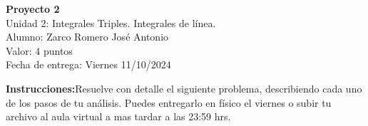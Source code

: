 \documentclass[12pt]{exam}
\begin{document}
\centering

\Large 
\textbf{Proyecto 2}\\
\large 
Unidad 2: Integrales Triples. Integrales de línea. \\
Alumno: Zarco Romero José Antonio\\
Valor: 4 puntos\\
\normalsize
Fecha de entrega: 
Viernes 11/10/2024

\vskip10pt

\normalsize

\pointformat{\bfseries\boldmath(\thepoints)}
\vskip10pt

\begin{tcolorbox}
  \textbf{Instrucciones:}Resuelve con detalle el siguiente problema, describiendo cada uno de los pasos de
  tu análisis. Puedes entregarlo en físico el viernes o subir tu archivo al aula virtual a mas tardar a
  las 23:59 hrs.
\end{tcolorbox}
\end{document}
